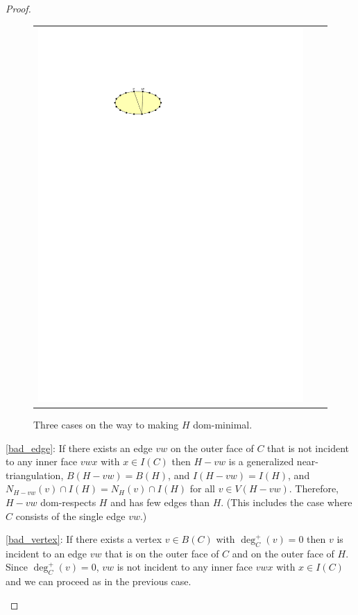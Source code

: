 \documentclass{article}
\theoremstyle{definition}
\begin{document}
\begin{proof}
\begin{figure}
\begin{tabular}{ccc}
      \includegraphics[page=6]{figs/minimal}
    \end{tabular}
    \caption{Three cases on the way to making $H$ dom-minimal.}
    \label{minimal_fig}
  \end{figure}
  \begin{compactenum}
    \item \cref{bad_edge}: If there exists an edge $vw$ on the outer face of $C$ that is not incident to any inner face $vwx$ with $x\in I(C)$ then $H-vw$ is a generalized near-triangulation, $B(H-vw)=B(H)$, and $I(H-vw)=I(H)$, and $N_{H-vw}(v)\cap I(H)=N_{H}(v)\cap I(H)$ for all $v\in V(H-vw)$. Therefore, $H-vw$ dom-respects $H$ and has few edges than $H$. (This includes the case where $C$ consists of the single edge $vw$.)

    \item \cref{bad_vertex}: If there exists a vertex $v\in B(C)$ with $\deg^+_C(v)=0$ then $v$ is incident to an edge $vw$ that is on the outer face of $C$ and on the outer face of $H$. Since $\deg^+_C(v)=0$, $vw$ is not incident to any inner face $vwx$ with $x\in I(C)$ and we can proceed as in the previous case.


\end{compactenum}
\end{proof}
\end{document}
